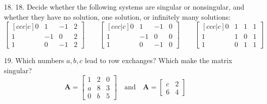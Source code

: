 \begin{itemize}
\begin{itemize}
      \item[18.] 18. Decide whether the following systems are singular or
        nonsingular, and whether they have no solution, one solution, or
        infinitely many solutions:
        \[%
        \begin{bmatrix}[ccc|c]
        0 & 1 & -1 & 2 \\
        1 & -1 & 0 & 2 \\
        1 & 0 & -1 & 2
        \end{bmatrix} \qquad
        \begin{bmatrix}[ccc|c]
        0 & 1 & -1 & 0 \\
        1 & -1 & 0 & 0 \\
        1 & 0 & -1 & 0
        \end{bmatrix} \qquad
        \begin{bmatrix}[ccc|c]
        0 & 1 & 1 & 1 \\
        1 & 1 & 0 & 1 \\
        1 & 0 & 1 & 1
        \end{bmatrix}
        \]%

      \item[19.] Which numbers \(a, b, c\) lead to row exchanges? Which make the
        matrix singular?
        \[%
        \bm{A} = \begin{bmatrix}
        1 & 2 & 0  \\
        a & 8 & 3 \\
        0 & b & 5
        \end{bmatrix}\quad\text{and}\quad
        \bm{A} = \begin{bmatrix}
        c & 2 \\
        6 & 4
        \end{bmatrix}
        \]%

    \end{itemize}


\end{itemize}
